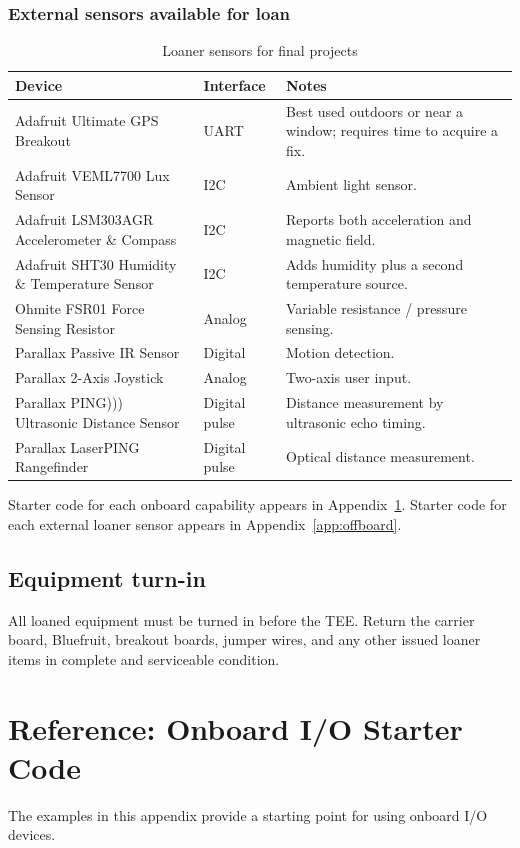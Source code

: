 \documentclass[11pt]{article}
\begin{document}
\subsubsection{External sensors available for loan}
\begin{table}[H]
\small
\centering
\caption{Loaner sensors for final projects}
\renewcommand{\arraystretch}{1.2}
\begin{tabularx}{\linewidth}{p{3in} p{0.8in} X}
\toprule
Device & Interface & Notes \\
\midrule
Adafruit Ultimate GPS Breakout & UART & Best used outdoors or near a window; requires time to acquire a fix. \\
Adafruit VEML7700 Lux Sensor & I2C & Ambient light sensor. \\
Adafruit LSM303AGR Accelerometer \& Compass & I2C & Reports both acceleration and magnetic field. \\
Adafruit SHT30 Humidity \& Temperature Sensor & I2C & Adds humidity plus a second temperature source. \\
Ohmite FSR01 Force Sensing Resistor & Analog & Variable resistance / pressure sensing. \\
Parallax Passive IR Sensor & Digital & Motion detection. \\
Parallax 2-Axis Joystick & Analog & Two-axis user input. \\
Parallax PING))) Ultrasonic Distance Sensor & Digital pulse & Distance measurement by ultrasonic echo timing. \\
Parallax LaserPING Rangefinder & Digital pulse & Optical distance measurement. \\
\bottomrule
\end{tabularx}
\end{table}

Starter code for each onboard capability appears in Appendix~\ref{app:onboard}. Starter code for each external loaner sensor appears in Appendix~\ref{app:offboard}.

\subsection{Equipment turn-in}
All loaned equipment must be turned in before the TEE. Return the carrier board, Bluefruit, breakout boards, jumper wires, and any other issued loaner items in complete and serviceable condition.

\newpage
\appendix

\section{Reference: Onboard I/O Starter Code}\label{app:onboard}
The examples in this appendix provide a starting point for using onboard I/O devices.
\end{document}
